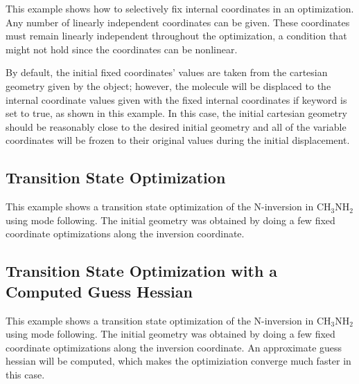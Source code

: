  This example shows how to selectively fix internal coordinates in an
optimization.  Any number of linearly independent coordinates can be given.
These coordinates must remain linearly independent throughout the
optimization, a condition that might not hold since the coordinates can be
nonlinear.

 By default, the initial fixed coordinates' values are taken from the
cartesian geometry given by the  object; however, the
molecule will be displaced to the internal coordinate values given with the
fixed internal coordinates if  keyword is set to
true, as shown in this example.  In this case, the initial cartesian
geometry should be reasonably close to the desired initial geometry and all
of the variable coordinates will be frozen to their original values during
the initial displacement.



\subsection{Transition State Optimization}
\label{tsexample}

This example shows a transition state optimization of the N-inversion in
$\mathrm{CH}_3\mathrm{NH}_2$ using mode following.  The initial geometry
was obtained by doing a few fixed coordinate optimizations along the
inversion coordinate.



\subsection{Transition State Optimization with a Computed Guess Hessian}

This example shows a transition state optimization of the N-inversion in
$\mathrm{CH}_3\mathrm{NH}_2$ using mode following.  The initial geometry
was obtained by doing a few fixed coordinate optimizations along the
inversion coordinate.  An approximate guess hessian will be computed, which
makes the optimiziation converge much faster in this case.


